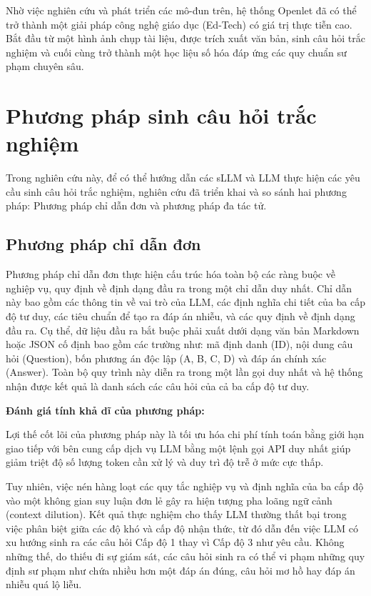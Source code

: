 Nhờ việc nghiên cứu và phát triển các mô-đun trên, hệ thống Openlet đã có thể trở thành một giải pháp công nghệ giáo dục (Ed-Tech) có giá trị thực tiễn cao. Bắt đầu từ một hình ảnh chụp tài liệu, được trích xuất văn bản, sinh câu hỏi trắc nghiệm và cuối cùng trở thành một học liệu số hóa đáp ứng các quy chuẩn sư phạm chuyên sâu.

\section{Phương pháp sinh câu hỏi trắc nghiệm}
Trong nghiên cứu này, để có thể hướng dẫn các sLLM và LLM thực hiện các yêu cầu sinh câu hỏi trắc nghiệm, nghiên cứu đã triển khai và so sánh hai phương pháp: Phương pháp chỉ dẫn đơn và phương pháp đa tác tử.

\subsection{Phương pháp chỉ dẫn đơn}
Phương pháp chỉ dẫn đơn thực hiện cấu trúc hóa toàn bộ các ràng buộc về nghiệp vụ, quy định về định dạng đầu ra trong một chỉ dẫn duy nhất. Chỉ dẫn này bao gồm các thông tin về vai trò của LLM, các định nghĩa chi tiết của ba cấp độ tư duy, các tiêu chuẩn để tạo ra đáp án nhiễu, và các quy định về định dạng đầu ra. Cụ thể, dữ liệu đầu ra bắt buộc phải xuất dưới dạng văn bản Markdown hoặc JSON cố định bao gồm các trường như: mã định danh (ID), nội dung câu hỏi (Question), bốn phương án độc lập (A, B, C, D) và đáp án chính xác (Answer). Toàn bộ quy trình này diễn ra trong một lần gọi duy nhất và hệ thống nhận được kết quả là danh sách các câu hỏi của cả ba cấp độ tư duy.

\textbf{Đánh giá tính khả dĩ của phương pháp:}

Lợi thế cốt lõi của phương pháp này là tối ưu hóa chi phí tính toán bằng giới hạn giao tiếp với bên cung cấp dịch vụ LLM bằng một lệnh gọi API duy nhất giúp giảm triệt độ số lượng token cần xử lý và duy trì độ trễ ở mức cực thấp.

Tuy nhiên, việc nén hàng loạt các quy tắc nghiệp vụ và định nghĩa của ba cấp độ vào một không gian suy luận đơn lẻ gây ra hiện tượng pha loãng ngữ cảnh (context dilution). Kết quả thực nghiệm cho thấy LLM thường thất bại trong việc phân biệt giữa các độ khó và cấp độ nhận thức, từ đó dẫn đến việc LLM có xu hướng sinh ra các câu hỏi Cấp độ 1 thay vì Cấp độ 3 như yêu cầu. Không những thế, do thiếu đi sự giám sát, các câu hỏi sinh ra có thể vi phạm những quy định sư phạm như chứa nhiều hơn một đáp án đúng, câu hỏi mơ hồ hay đáp án nhiễu quá  lộ liễu.

